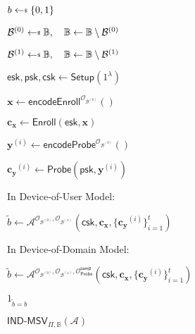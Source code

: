 \begin{figure}[h]
\centering

	\begin{minipage}[t]{0.6\textwidth}
	\begin{algorithm}[H]
	\caption{$\textsf{IND-MSV}_{\Pi, \mathbb{B}}(\mathcal{A})$}
	\label{alg:ind-msv_game}
	\begin{algorithmic}[1]
		\State $b \getsdollar \{0, 1\}$

		\State $\mathcal{B}^{(0)} \getsdollar \mathbb{B}, \quad \mathbb{B} \gets \mathbb{B} \setminus \mathcal{B}^{(0)}$

		\State $\mathcal{B}^{(1)} \getsdollar \mathbb{B}, \quad \mathbb{B} \gets \mathbb{B} \setminus \mathcal{B}^{(1)}$

		\State $\textsf{esk}, \textsf{psk}, \textsf{csk} \gets \textsf{Setup}(1^\lambda)$

		\State $\mathbf{x} \gets \textsf{encodeEnroll}^{\mathcal{O}_{\mathcal{B}^{(b)}}}()$

		\State $\mathbf{c_x} \gets \textsf{Enroll}(\textsf{esk}, \mathbf{x})$


			\State $\mathbf{y}^{(i)} \gets \textsf{encodeProbe}^{\mathcal{O}_{\mathcal{B}^{(b)}}}() $
		
			\State $\mathbf{c_y}^{(i)} \gets \textsf{Probe}( \textsf{psk}, \mathbf{y}^{(i)} )$

		\EndFor

		\State In Device-of-User Model:
		
			\State \hspace{\algorithmicindent} $\tilde{b} \gets \mathcal{A}^{\mathcal{O}_{\mathcal{B}^{(0)}}, \mathcal{O}_{\mathcal{B}^{(1)}} } ( \textsf{csk}, \mathbf{c_x}, \{ \mathbf{c_y}^{(i)} \}_{i=1}^t )$

		\State In Device-of-Domain Model:
		
			\State \hspace{\algorithmicindent} $\tilde{b} \gets \mathcal{A}^{\mathcal{O}_{\mathcal{B}^{(0)}}, \mathcal{O}_{\mathcal{B}^{(1)}}, \mathcal{O}_{\textsf{Probe}}^{\textsf{samp}}} ( \textsf{csk}, \mathbf{c_x}, \{ \mathbf{c_y}^{(i)} \}_{i=1}^t )$

		\State \Return $1_{\tilde{b} = b}$
	\end{algorithmic}
	\end{algorithm}
	\end{minipage}

\label{fig:ind-msv_game}
\end{figure}

